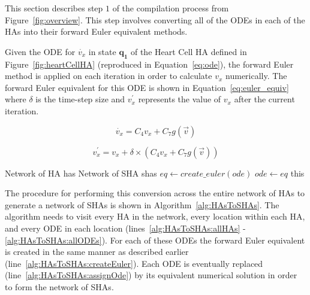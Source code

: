 This section describes step $1$ of the compilation process from Figure~\ref{fig:overview}.
This step involves converting all of the \acp{ODE} in each of the \acp{HA} into their forward Euler equivalent methods.

Given the \ac{ODE} for $\dot{v_x}$ in state $\mathbf{q_1}$ of the Heart Cell \ac{HA} defined in Figure~\ref{fig:heartCellHA} (reproduced in Equation~\ref{eq:ode}), the forward Euler method is applied on each iteration in order to calculate $v_x$ numerically.
The forward Euler equivalent for this ODE is shown in Equation~\ref{eq:euler_equiv} where $\delta$ is the time-step size and $v^\prime_x$ represents the value of $v_x$ after the current iteration.

\begin{equation}
\dot{v_x} = C_{4} v_x + C_{7} g(\vec{v})
\label{eq:ode}
\end{equation}

\begin{equation}
v^\prime_x = v_x + \delta \times (C_{4} v_x + C_{7} g(\vec{v}))
\label{eq:euler_equiv}
\end{equation}

\renewcommand{\algorithmiccomment}[1]{// #1}
\renewcommand{\algorithmicrequire}{\textbf{Input:}}
\renewcommand{\algorithmicensure}{\textbf{Output:}}
\begin{algorithm}[t!]
	\begin{algorithmic}[1]
		\REQUIRE Network of HA has 
		\ENSURE Network of SHA shas
		 \label{alg:HAsToSHAs:allHAs}
		  \label{alg:HAsToSHAs:allLocs}
		 \label{alg:HAsToSHAs:allODEs}
		\STATE $eq \leftarrow create\_euler(ode)$ \label{alg:HAsToSHAs:createEuler}
		\STATE $ode \leftarrow eq$ \label{alg:HAsToSHAs:assignOde}
		\ENDFOR
		\ENDFOR
		\ENDFOR
		\RETURN this
	\end{algorithmic}
	\caption{The algorithm to generate a Network of \acp{SHA} from a Network of \acp{HA}}
	\label{alg:HAsToSHAs}
\end{algorithm}

The procedure for performing this conversion across the entire network of \acp{HA} to generate a network of \acp{SHA} is shown in Algorithm~\ref{alg:HAsToSHAs}.
The algorithm needs to visit every \ac{HA} in the network, every location within each \ac{HA}, and every \ac{ODE} in each location (lines~\ref{alg:HAsToSHAs:allHAs} - \ref{alg:HAsToSHAs:allODEs}).
For each of these \acp{ODE} the forward Euler equivalent is created in the same manner as described earlier (line~\ref{alg:HAsToSHAs:createEuler}).
Each \ac{ODE} is eventually replaced (line~\ref{alg:HAsToSHAs:assignOde}) by its equivalent numerical solution in order to form the network of \acp{SHA}.
